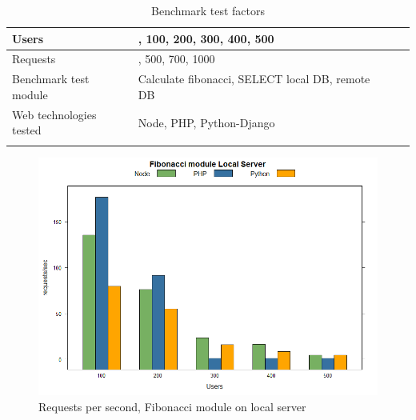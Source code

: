 \documentclass[../thesis.tex]{subfiles}
\begin{document}
	\begin{table}[H]
		\caption{Benchmark test factors}
		\centering
		\footnotesize
		\label{tab1}
		\begin{tabular}{!{\color{sapphire}\vrule width 1pt}m{0.22\textwidth}!{\color{black}\vrule width 1pt}m{0.22\textwidth}!{\color{black}\vrule width 1pt}m{0.22\textwidth}!{\color{black}\vrule width 1pt}m{0.22\textwidth}!{\color{sapphire}\vrule width 1pt}}
			\hline
			\Centering Users &
			, 100, 200, 300, 400, 500 \\
			\hline
			\Centering Requests &
			, 500, 700, 1000 \\
			\hline
			\Centering Benchmark test module & 
			\Centering Calculate fibonacci, SELECT local DB, remote DB \\
			\hline
			\Centering Web technologies tested & 
			\Centering Node, PHP, Python-Django \\
			\hline
			\hline
		\end{tabular}
	\end{table} 
	\lipsum[1-1]
	\begin{figure}[H]
		\centering
		\includegraphics[width=1\textwidth]{../images/fibLocalreq.png}
		\caption{Requests per second, Fibonacci module on local server}
		\label{rys1}
	\end{figure}
\end{document}
